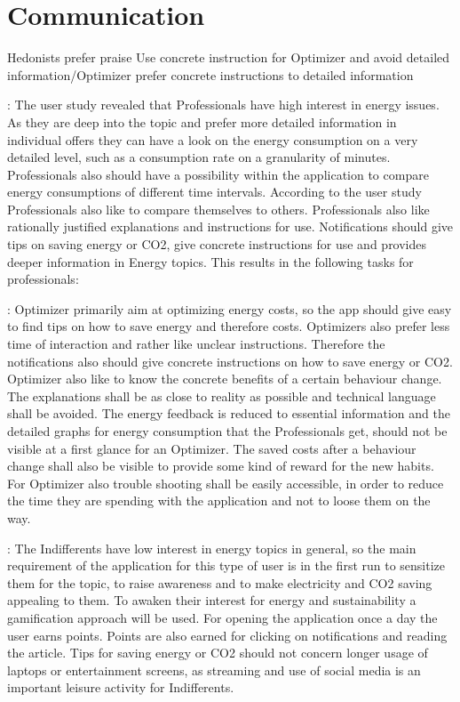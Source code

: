 \section{Communication}
Hedonists prefer praise 
Use concrete instruction for Optimizer and avoid detailed information/Optimizer prefer concrete instructions to detailed information



: The user study revealed that Professionals have high interest in energy issues. As they are deep into the topic and prefer more detailed information in individual offers they can have a look on the energy consumption on a very detailed level, such as a consumption rate on a granularity of minutes. Professionals also should have a possibility within the application to compare energy consumptions of different time intervals. According to the user study Professionals also like to compare themselves to others. Professionals also like rationally justified explanations and instructions for use. Notifications should give tips on saving energy or CO2, give concrete instructions for use and provides deeper information in Energy topics. This results in the following tasks for professionals:



: Optimizer primarily aim at optimizing energy costs, so the app should give easy to find tips on how to save energy and therefore costs. Optimizers also prefer less time of interaction and rather like unclear instructions. Therefore the notifications also should give concrete instructions on how to save energy or CO2. Optimizer also like to know the concrete benefits of a certain behaviour change. The explanations shall be as close to reality as possible and technical language shall be avoided. The energy feedback is reduced to essential information and the detailed graphs for energy consumption that the Professionals get, should not be visible at a first glance for an Optimizer. The saved costs after a behaviour change shall also be visible to provide some kind of reward for the new habits. For Optimizer also trouble shooting shall be easily accessible, in order to reduce the time they are spending with the application and not to loose them on the way.



:
The Indifferents have low interest in energy topics in general, so the main requirement of the application for this type of user is in the first run to sensitize them for the topic, to raise awareness and to make electricity and CO2 saving appealing to them. To awaken their interest for energy and sustainability a gamification approach will be used. For opening the application once a day the user earns points. Points are also earned for clicking on notifications and reading the article. Tips for saving energy or CO2 should not concern longer usage of laptops or entertainment screens, as streaming and use of social media is an important leisure activity for Indifferents.


